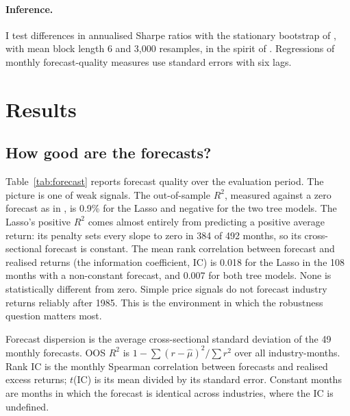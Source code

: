 \documentclass[11pt]{article}
\begin{document}
\paragraph{Inference.} I test differences in annualised Sharpe ratios with the stationary bootstrap of \citet{politis1994}, with mean block length 6 and 3{,}000 resamples, in the spirit of \citet{ledoit2008}. Regressions of monthly forecast-quality measures use \citet{newey1987} standard errors with six lags.

\section{Results}\label{sec:results}

\subsection{How good are the forecasts?}

Table~\ref{tab:forecast} reports forecast quality over the evaluation period. The picture is one of weak signals. The out-of-sample $R^2$, measured against a zero forecast as in \citet{gu2020}, is 0.9\% for the Lasso and negative for the two tree models. The Lasso's positive $R^2$ comes almost entirely from predicting a positive average return: its penalty sets every slope to zero in 384 of 492 months, so its cross-sectional forecast is constant. The mean rank correlation between forecast and realised returns (the information coefficient, IC) is 0.018 for the Lasso in the 108 months with a non-constant forecast, and 0.007 for both tree models. None is statistically different from zero. Simple price signals do not forecast industry returns reliably after 1985. This is the environment in which the robustness question matters most.

\begin{table}[!htbp]\centering
\caption{Forecast quality, July 1985--June 2026}\label{tab:forecast}
\small
\begin{minipage}{0.95\linewidth}\footnotesize\smallskip
Forecast dispersion is the average cross-sectional standard deviation of the 49 monthly forecasts. OOS $R^2$ is $1-\sum(r-\hat\mu)^2/\sum r^2$ over all industry-months. Rank IC is the monthly Spearman correlation between forecasts and realised excess returns; $t$(IC) is its mean divided by its standard error. Constant months are months in which the forecast is identical across industries, where the IC is undefined.
\end{minipage}
\end{table}
\end{document}
